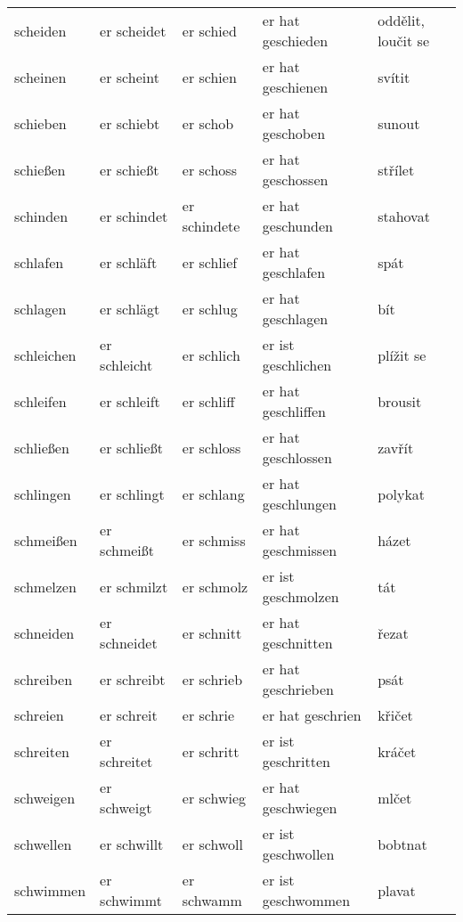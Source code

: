 \documentclass[a4paper,12pt]{report}
\begin{document}
\begin{longtable}{ | m{2cm} | m{2.5cm} | m{2.5cm} | m{4cm} | m{3cm} | }
    scheiden    & er scheidet   & er schied    & er hat geschieden  & oddělit, loučit se \\
    scheinen    & er scheint    & er schien    & er hat geschienen  & svítit             \\
    schieben    & er schiebt    & er schob     & er hat geschoben   & sunout             \\
    schießen    & er schießt    & er schoss    & er hat geschossen  & střílet            \\
    schinden    & er schindet   & er schindete & er hat geschunden  & stahovat           \\
    schlafen    & er schläft    & er schlief   & er hat geschlafen  & spát               \\
    schlagen    & er schlägt    & er schlug    & er hat geschlagen  & bít                \\
    schleichen  & er schleicht  & er schlich   & er ist geschlichen & plížit se          \\
    schleifen   & er schleift   & er schliff   & er hat geschliffen & brousit            \\
    schließen   & er schließt   & er schloss   & er hat geschlossen & zavřít             \\
    schlingen   & er schlingt   & er schlang   & er hat geschlungen & polykat            \\
    schmeißen   & er schmeißt   & er schmiss   & er hat geschmissen & házet              \\
    schmelzen   & er schmilzt   & er schmolz   & er ist geschmolzen & tát                \\
    schneiden   & er schneidet  & er schnitt   & er hat geschnitten & řezat              \\
    schreiben   & er schreibt   & er schrieb   & er hat geschrieben & psát               \\
    schreien    & er schreit    & er schrie    & er hat geschrien   & křičet             \\
    schreiten   & er schreitet  & er schritt   & er ist geschritten & kráčet             \\
    schweigen   & er schweigt   & er schwieg   & er hat geschwiegen & mlčet              \\
    schwellen   & er schwillt   & er schwoll   & er ist geschwollen & bobtnat            \\
    schwimmen   & er schwimmt   & er schwamm   & er ist geschwommen & plavat             \\

\end{longtable}
\end{document}

